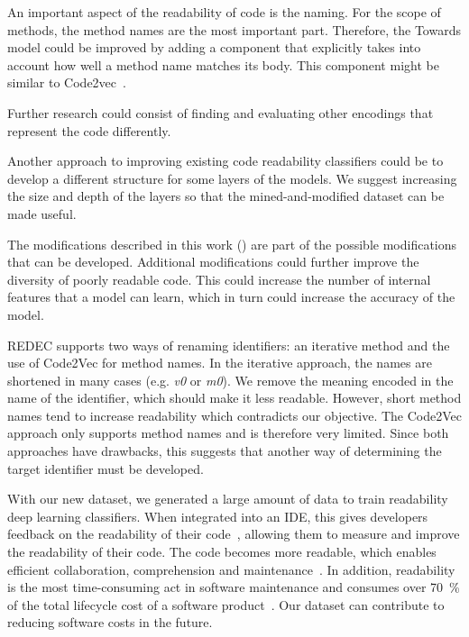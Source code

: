 \documentclass[%
class=scrreprt,
chapterprefix=false,%
open=right,%
twoside=true,%
paper=a4,%
logofile={Logo\_zentral\_farbig\_EN.png},%
thesistype=master,%
UKenglish,%
]{se2thesis}
\theoremstyle{definition}
\begin{document}
	An important aspect of the readability of code is the naming. For the scope of methods, the method names are the most important part. Therefore, the Towards model could be improved by adding a component that explicitly takes into account how well a method name matches its body. This component might be similar to Code2vec~\cite{alon2019code2vec}.
	
	Further research could consist of finding and evaluating other encodings that represent the code differently.
	
	Another approach to improving existing code readability classifiers could be to develop a different structure for some layers of the models. We suggest increasing the size and depth of the layers so that the mined-and-modified dataset can be made useful.
	
	The modifications described in this work () are part of the possible modifications that can be developed. Additional modifications could further improve the diversity of poorly readable code. This could increase the number of internal features that a model can learn, which in turn could increase the accuracy of the model.
	
	REDEC supports two ways of renaming identifiers: an iterative method and the use of Code2Vec for method names. In the iterative approach, the names are shortened in many cases (e.g. \textit{v0} or \textit{m0}). We remove the meaning encoded in the name of the identifier, which should make it less readable. However, short method names tend to increase readability which contradicts our objective. The Code2Vec approach only supports method names and is therefore very limited. Since both approaches have drawbacks, this suggests that another way of determining the target identifier must be developed.
	
	With our new dataset, we generated a large amount of data to train readability deep learning classifiers. When integrated into an IDE, this gives developers feedback on the readability of their code~\cite{choi2020metric}, allowing them to measure and improve the readability of their code. The code becomes more readable, which enables efficient collaboration, comprehension and maintenance~\cite{posnett2011simpler, aggarwal2002integrated}.
	In addition, readability is the most time-consuming act in software maintenance and consumes over 70~\% of the total lifecycle cost of a software product~\cite{buse2009learning, deimel1985uses, rugaber2000use, boehm2001defect}. Our dataset can contribute to reducing software costs in the future.
	
\end{document}

